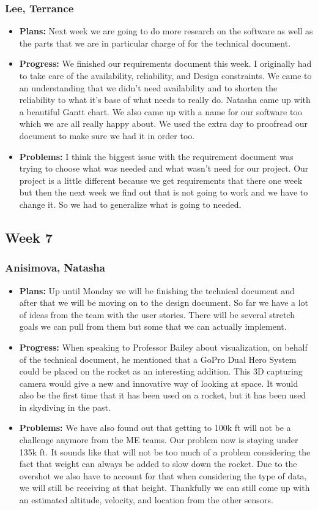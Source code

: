 \documentclass[10pt,draftclsnofoot,onecolumn]{IEEEtran}
\begin{document}
\subsubsection{Lee, Terrance}
\begin{itemize}
	\item \textbf{Plans: }Next week we are going to do more research on the software as well as the parts that we are in particular charge of for the technical document.
	\item \textbf{Progress: }We finished our requirements document this week. I originally had to take care of the availability, reliability, and Design constraints. We came to an understanding that we didn’t need availability and to shorten the reliability to what it’s base of what needs to really do. Natasha came up with a beautiful Gantt chart. We also came up with a name for our software too which we are all really happy about. We used the extra day to proofread our document to make sure we had it in order too.
	\item \textbf{Problems: }I think the biggest issue with the requirement document was trying to choose what was needed and what wasn’t need for our project. Our project is a little different because we get requirements that there one week but then the next week we find out that is not going to work and we have to change it. So we had to generalize what is going to needed.
\end{itemize}
\subsection{Week 7}
\subsubsection{Anisimova, Natasha}
\begin{itemize}
	\item \textbf{Plans: }
	Up until Monday we will be finishing the technical document and after that we will be moving on to the design document. So far we have a lot of ideas from the team with the user stories. There will be several stretch goals we can pull from them but some that we can actually implement.
	\item \textbf{Progress: }
	When speaking to Professor Bailey about visualization, on behalf of the technical document, he mentioned that a GoPro Dual Hero System could be placed on the rocket as an interesting addition. This 3D capturing camera would give a new and innovative way of looking at space. It would also be the first time that it has been used on a rocket, but it has been used in skydiving in the past. 
	\item \textbf{Problems: }
	We have also found out that getting to 100k ft will not be a challenge anymore from the ME teams. Our problem now is staying under 135k ft. It sounds like that will not be too much of a problem considering the fact that weight can always be added to slow down the rocket. Due to the overshot we also have to account for that when considering the type of data, we will still be receiving at that height. Thankfully we can still come up with an estimated altitude, velocity, and location from the other sensors.
\end{itemize}
\end{document}
